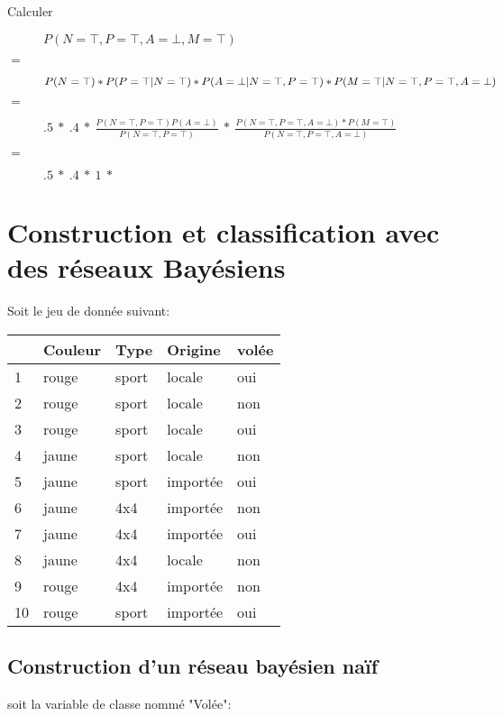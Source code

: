 \begin{description}
\item[Calculer] $P(N=\top,P=\top,A=\bot,M=\top)$
\item[$=$] $P(N=\top) * P(P=\top|N=\top) * P(A=\bot|N=\top,P=\top) * \linebreak P(M=\top|N=\top,P=\top,A=\bot)$
\item[$=$] $ .5\ *\ .4\ *\ \frac{P(N=\top,P=\top)P(A=\bot)}{P(N=\top,P=\top)}\ *\ \frac{P(N=\top,P=\top,A=\bot)*P(M=\top)}{P(N=\top,P=\top,A=\bot)}$
\item[$=$] $ .5\ *\ .4\ *\ 1\ *\ $
\end{description}

\pagebreak
\section{Construction et classification avec des réseaux Bayésiens}
Soit le jeu de donnée suivant:

\begin{tabular}{l|llll}
  \hline
   $ $ & Couleur & Type & Origine & volée \\
  \hline
  1 & rouge & sport & locale & oui\\
  2 & rouge & sport & locale & non\\
  3 & rouge & sport & locale & oui\\
  4 & jaune & sport & locale & non\\
  5 & jaune & sport & importée & oui\\
  6 & jaune & 4x4 & importée & non\\
  7 & jaune & 4x4 & importée & oui\\
  8 & jaune & 4x4 & locale & non\\
  9 & rouge & 4x4 & importée & non\\
  10 & rouge & sport & importée & oui\\
  \hline
\end{tabular}

\subsection{Construction d'un réseau bayésien naïf}
soit la variable de classe nommé "Volée": 


